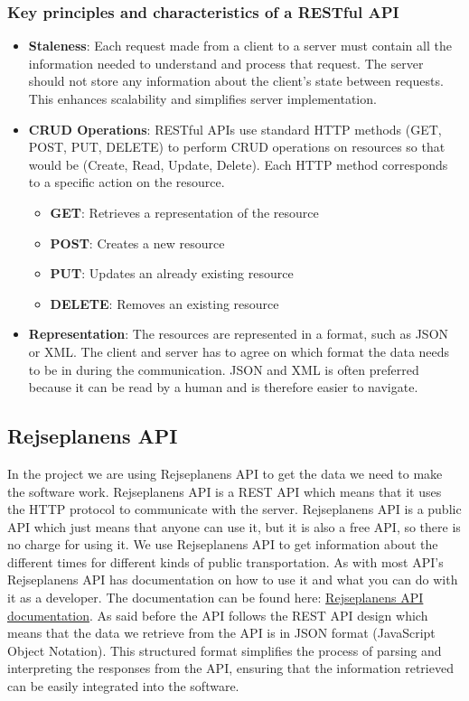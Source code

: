 \subsubsection{Key principles and characteristics of a RESTful API}
\label{subsubsec:key-principles-and-characteristics-of-a-restful-api}
\begin{itemize}
    \item \textbf{Staleness}: Each request made from a client to a server must contain all the information needed to
    understand and process that request.
    The server should not store any information about the client's state between requests.
    This enhances scalability and simplifies server implementation.
    \item \textbf{CRUD Operations}: RESTful APIs use standard HTTP methods (GET, POST, PUT, DELETE) to perform CRUD
    operations on resources so that would be (Create, Read, Update, Delete).
    Each HTTP method corresponds to a specific action on the resource.
    \begin{itemize}
        \item \textbf{GET}: Retrieves a representation of the resource
        \item \textbf{POST}: Creates a new resource
        \item \textbf{PUT}: Updates an already existing resource
        \item \textbf{DELETE}: Removes an existing resource
    \end{itemize}
    \item \textbf{Representation}: The resources are represented in a format, such as JSON or XML.
    The client and server has to agree on which format the data needs to be in during the communication.
    JSON and XML is often preferred because it can be read by a human and is therefore easier to navigate.
\end{itemize}


\subsection{Rejseplanens API}\label{subsec:rejseplanens-api}

In the project we are using Rejseplanens API to get the data we need to make the software work.
Rejseplanens API is a REST API which means that it uses the HTTP protocol to communicate with the server.
Rejseplanens API is a public API which just means that anyone can use it, but it is also a free API, so there is no
charge for using it.
We use Rejseplanens API to get information about the different times for different kinds of public transportation.
As with most API's Rejseplanens API has documentation on how to use it and what you can do with it as a developer.
The documentation can be found here: \href{https://help.rejseplanen.dk/hc/da/articles/214174465-Rejseplanens-API}
{Rejseplanens API documentation}.
As said before the API follows the REST API design which means that the data we retrieve from the API is in JSON format
(JavaScript Object Notation).
This structured format simplifies the process of parsing and interpreting the responses from the API, ensuring that
the information retrieved can be easily integrated into the software.

